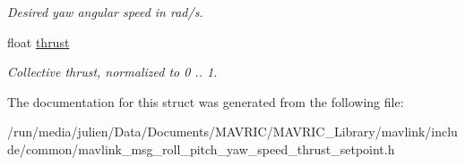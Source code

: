 \begin{DoxyCompactItemize}
\begin{DoxyCompactList}\small\item\em Desired yaw angular speed in rad/s. \end{DoxyCompactList}\item 
\hypertarget{struct____mavlink__roll__pitch__yaw__speed__thrust__setpoint__t_ab28bd5d6a16896a4358b8f182d2b6a17}{float \hyperlink{struct____mavlink__roll__pitch__yaw__speed__thrust__setpoint__t_ab28bd5d6a16896a4358b8f182d2b6a17}{thrust}}\label{struct____mavlink__roll__pitch__yaw__speed__thrust__setpoint__t_ab28bd5d6a16896a4358b8f182d2b6a17}

\begin{DoxyCompactList}\small\item\em Collective thrust, normalized to 0 .. 1. \end{DoxyCompactList}\end{DoxyCompactItemize}


The documentation for this struct was generated from the following file\+:\begin{DoxyCompactItemize}
\item 
/run/media/julien/\+Data/\+Documents/\+M\+A\+V\+R\+I\+C/\+M\+A\+V\+R\+I\+C\+\_\+\+Library/mavlink/include/common/mavlink\+\_\+msg\+\_\+roll\+\_\+pitch\+\_\+yaw\+\_\+speed\+\_\+thrust\+\_\+setpoint.\+h\end{DoxyCompactItemize}
